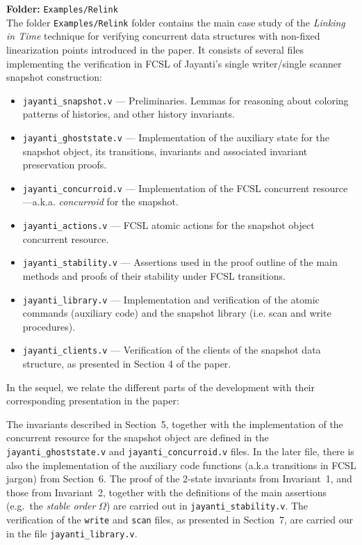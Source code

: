 \documentclass[a4paper,USenglish]{lipics-v2016}
\begin{document}
\vspace{.5cm}

{\bf \large Folder:} \texttt{Examples/Relink}\\

The folder \texttt{Examples/Relink} folder contains the main case
study of the {\it Linking in Time} technique for verifying concurrent
data structures with non-fixed linearization points introduced in the
paper. It consists of several files implementing the verification in
FCSL of Jayanti's single writer/single scanner snapshot construction:

\begin{itemize}

 \item \texttt{jayanti\_snapshot.v} --- Preliminaries. Lemmas for
       reasoning about coloring patterns of histories, and other
       history invariants.

 \item \texttt{jayanti\_ghoststate.v} --- Implementation of the
 auxiliary state for the snapshot object, its transitions, invariants
 and associated invariant preservation proofs.

 \item \texttt{jayanti\_concurroid.v} --- Implementation of the FCSL
 concurrent resource ---a.k.a. {\it concurroid} for the snapshot.

 \item \texttt{jayanti\_actions.v} --- FCSL atomic actions for the
 snapshot object concurrent resource.

 \item \texttt{jayanti\_stability.v} --- Assertions used in the proof
 outline of the main methods and proofs of their stability under FCSL
 transitions.

 \item \texttt{jayanti\_library.v} --- Implementation and verification
 of the atomic commands (auxiliary code) and the snapshot library
 (i.e. scan and write procedures).

 \item \texttt{jayanti\_clients.v} --- Verification of the clients of
   the snapshot data structure, as presented in Section 4 of the
   paper.
\end{itemize}

In the sequel, we relate the different parts of the development with
their corresponding presentation in the paper:

The invariants described in Section~5, together with the
implementation of the concurrent resource for the snapshot object are
defined in the \texttt{jayanti\_ghoststate.v} and
\texttt{jayanti\_concurroid.v} files. In the later file, there is also
the implementation of the auxiliary code functions (a.k.a transitions
in FCSL jargon) from Section~6. The proof of the 2-state invariants
from Invariant~1, and those from Invariant~2, together with the
definitions of the main assertions (e.g.\ the {\it stable order}
$\Omega$) are carried out in \texttt{jayanti\_stability.v}. The
verification of the \texttt{write} and \texttt{scan} files, as
presented in Section~7, are carried our in the file
\texttt{jayanti\_library.v}.
\end{document}
